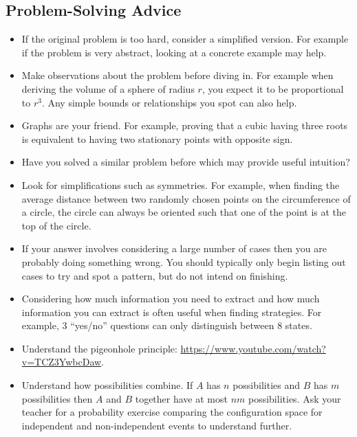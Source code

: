 \subsection{Problem-Solving Advice}

\begin{itemize}
	\item If the original problem is too hard, consider a simplified version. For example if the problem is very abstract, looking at a concrete example may help.
	\item Make observations about the problem before diving in. For example when deriving the volume of a sphere of radius $r$, you expect it to be proportional to $r^3$. Any simple bounds or relationships you spot can also help.
	\item Graphs are your friend. For example, proving that a cubic having three roots is equivalent to having two stationary points with opposite sign.
	\item Have you solved a similar problem before which may provide useful intuition?
	\item Look for simplifications such as symmetries. For example, when finding the average distance between two randomly chosen points on the circumference of a circle, the circle can always be oriented such that one of the point is at the top of the circle.
	\item If your answer involves considering a large number of cases then you are probably doing something wrong. You should typically only begin listing out cases to try and spot a pattern, but do not intend on finishing.
	\item Considering how much information you need to extract and how much information you can extract is often useful when finding strategies. For example, 3 “yes/no” questions can only distinguish between 8 states.
	\item Understand the pigeonhole principle: \url{https://www.youtube.com/watch?v=TCZ3YwbcDaw}.
	\item Understand how possibilities combine. If $A$ has $n$ possibilities and $B$ has $m$ possibilities then $A$ and $B$ together have at most $nm$ possibilities. Ask your teacher for a probability exercise comparing the configuration space for independent and non-independent events to understand further.
\end{itemize}